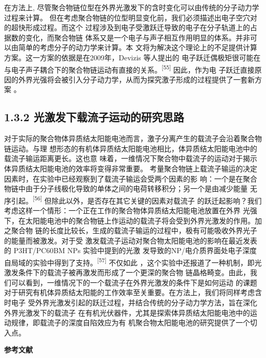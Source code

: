 \documentclass[12pt,]{report}
\begin{document}
在方法上,
尽管聚合物链位型在外界光激发下的含时变化可以由传统的分子动力学过程来计算。
但在考虑聚合物链的位型明显变化前，我们必须描述出电子空穴对的超快形成过程。而这个
过程涉及到电子受激跃迁导致的电子在分子轨道上的占据数的变化，而聚合物链
体系又是一个电子与声子相互作用明显的体系。并非可以由简单的考虑分子的动力学来计算。本
文将为解决这个理论上的不足提供计算方案。这一方案的依据是在2009年，Devizis
等人提出的
电子跃迁偶极矩很可能在与电子声子耦合下的聚合物链运动有直接的关系。\textsuperscript{{[}55{]}}
因此，作为电
子跃迁直接原因的外界光强将会被引入分子动力学，从而为探究激子形成的过程提供了一套新方
案 。

\subsection{1.3.2
光激发下载流子运动的研究思路}\label{ux5149ux6fc0ux53d1ux4e0bux8f7dux6d41ux5b50ux8fd0ux52a8ux7684ux7814ux7a76ux601dux8def}

对于实际的聚合物体异质结太阳能电池而言，激子分离产生的载流子会沿着聚合物链运动。与理
想形态的有机体异质结太阳能电池相比，体异质结太阳能电池中的载流子输运距离更长。这也意
味着，一维情况下聚合物中载流子的运动对于揭示体异质结太阳能电池的效率将变得非常重要。
考量聚合物链上载流子输运的决定因素时，在实验中已经观察到了载流子输运会受两个因素的影
响：一个是在聚合物链中由于分子线极化导致的单体之间的电荷转移积分；另一个是由减少能量
无序引起。\textsuperscript{{[}56{]}}
但除此以外，是否存在其它关键的因素对载流子
的跃迁起影响？我们考虑这样一个情形：一个正在工作的聚合物体异质结太阳能电池放置在外界
光强下，在太阳能电池中的聚合物链上作运动的载流子将会受到外界光激发的作用。加之聚合物
链的长度比较长，生成的载流子输运的过程中，极有可能吸收外界光子的能量而被激发。对于受
激发载流子运动对聚合物太阳能电池的影响在最近发表的 P3HT/PC60BM NPs
实验中提到的光激
发导致的NP/电介质界面处电子深度自局域的实验中得到了支持。\textsuperscript{{[}57{]}}
不仅如此
，这个实验中还报道了一种机制，即光激发条件下的载流子被再激发而形成了一个更深的聚合物
链晶格畸变。由此，我们可以看到，一维情况下的一个载流子在外界光激发的条件下是如何运动
的课题对于研究有机体异质结太阳能的工作效率至关重要。在方法上，我们将同样考虑含时电子
受外界光激发引起的跃迁过程，并结合传统的分子动力学方法，旨在深化外界光激发下的载流子
在有机光伏器件，尤其是探索体异质结太阳能电池中的运动规律，即载流子的深度自陷效应为有
机聚合物太阳能电池的研究提供了一个切入点。

\clearpage
\clearpage

\begin{center}
\Huge \textbf{参考文献}
\end{center}
\end{document}
